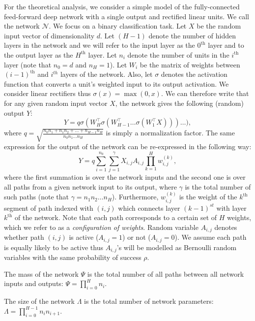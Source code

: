 \documentclass[twoside]{article}
\begin{document}
For the theoretical analysis, we consider a simple model of the fully-connected feed-forward deep network with a single output and rectified linear units. We call the network $\mathcal{N}$. We focus on a binary classification task. Let $X$ be the random input vector of dimensionality $d$. Let $(H-1)$ denote the number of hidden layers in the network and we will refer to the input layer as the $0^{\text{th}}$ layer and to the output layer as the $H^{\text{th}}$ layer. Let $n_i$ denote the number of units in the $i^{\text{th}}$ layer (note that $n_0 = d$ and $n_H = 1$). Let $W_i$ be the matrix of weights between $(i - 1)^{\text{th}}$ and $i^{th}$ layers of the network. Also, let $\sigma$ denotes the activation function that converts a unit's weighted input to its output activation. We consider linear rectifiers thus $\sigma(x) = \max(0,x)$. We can therefore write that for any given random input vector $X$, the network gives the following (random) output $Y$:
\[Y = q\sigma(W_H^{\top}\sigma(W_{H-1}^{\top}\dots\sigma(W_1^{\top}X)))\dots),
\]
where $q = \sqrt{\frac{n_0n_1 + n_1n_2 + ... + n_{H-1}n_H}{n_0n_1...n_H}}$ is simply a normalization factor. The same expression for the output of the network can be re-expressed in the following way:
\begin{equation}
Y = q\sum_{i=1}^{n_0}\sum_{j = 1}^\gamma X_{i,j}A_{i,j}\prod_{k = 1}^{H}w_{i,j}^{(k)},
\label{eq:befrein}
\end{equation}
where the first summation is over the network inputs and the second one is over all paths from a given network input to its output, where $\gamma$ is the total number of such paths (note that $\gamma = n_1n_2\dots n_H$). Furthermore, $w_{i,j}^{(k)}$ is the weight of the $k^{\text{th}}$ segment of path indexed with $(i,j)$ which connects layer $(k-1)^{st}$ with layer $k^{\text{th}}$ of the network. Note that each path corresponds to a certain set of $H$ weights, which we refer to as a \textit{configuration of weights}. Random variable $A_{i,j}$ denotes whether path $(i,j)$ is active ($A_{i,j} = 1$) or not ($A_{i,j} = 0$).  We assume each path is equally likely to be active thus $A_{i,j}$'s will be modelled as Bernoulli random variables with the same probability of success $\rho$. 

\begin{definition}
The mass of the network $\Psi$ is the total number of all paths between all network inputs and outputs: $\Psi = \prod_{i=0}^Hn_i$.
\end{definition}

\begin{definition}
The size of the network $\Lambda$ is the total number of network parameters: $\Lambda = \prod_{i=0}^{H-1}n_in_{i+1}$.
\end{definition}
\end{document}
